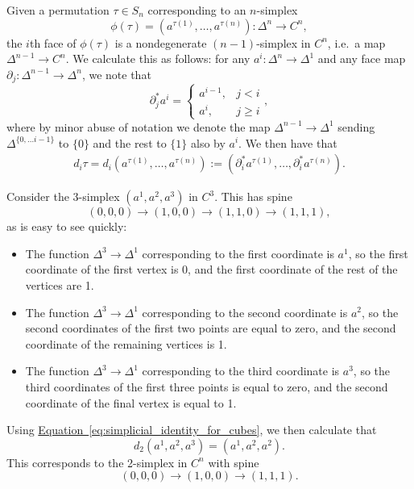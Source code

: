 \documentclass[main.tex]{subfiles}
\begin{document}
Given a permutation $\tau \in S_{n}$ corresponding to an $n$-simplex
\begin{equation*}
  \phi(\tau) = (a^{\tau(1)}, \ldots, a^{\tau(n)})\colon \Delta^{n} \to C^{n},
\end{equation*}
the $i$th face of $\phi(\tau)$ is a nondegenerate $(n-1)$-simplex in $C^{n}$, i.e.\ a map $\Delta^{n-1} \to C^{n}$. We calculate this as follows: for any $a^{i}\colon \Delta^{n} \to \Delta^{1}$ and any face map $\partial_{j}\colon \Delta^{n-1} \to \Delta^{n}$, we note that
\begin{equation*}
  \partial_{j}^{*}a^{i} =
  \begin{cases}
    a^{i-1}, & j < i \\
    a^{i}, & j \geq i
  \end{cases},
\end{equation*}
where by minor abuse of notation we denote the map $\Delta^{n-1} \to \Delta^{1}$ sending $\Delta^{\{0, \ldots i-1\}}$ to $\{0\}$ and the rest to $\{1\}$ also by $a^{i}$. We then have that
\begin{gather*}
  \label{eq:simplicial_identity_for_cubes}
  d_{i}\tau = d_{i}(a^{\tau(1)}, \ldots, a^{\tau(n)}) := (\partial_{i}^{*} a^{\tau(1)}, \ldots, \partial_{i}^{*} a^{\tau(n)}).
\end{gather*}

\begin{example}
  Consider the 3-simplex $(a^{1}, a^{2}, a^{3})$ in $C^{3}$. This has spine
  \begin{equation*}
    (0, 0, 0) \to (1, 0, 0) \to (1, 1, 0) \to (1, 1, 1),
  \end{equation*}
  as is easy to see quickly:
  \begin{itemize}
    \item The function $\Delta^{3} \to \Delta^{1}$ corresponding to the first coordinate is $a^{1}$, so the first coordinate of the first vertex is 0, and the first coordinate of the rest of the vertices are 1.

    \item The function $\Delta^{3} \to \Delta^{1}$ corresponding to the second coordinate is $a^{2}$, so the second coordinates of the first two points are equal to zero, and the second coordinate of the remaining vertices is 1.

    \item The function $\Delta^{3} \to \Delta^{1}$ corresponding to the third coordinate is $a^{3}$, so the third coordinates of the first three points is equal to zero, and the second coordinate of the final vertex is equal to 1.
  \end{itemize}
  Using \hyperref[eq:simplicial_identity_for_cubes]{Equation~\ref*{eq:simplicial_identity_for_cubes}}, we then calculate that
  \begin{equation*}
    d_{2} (a^{1}, a^{2}, a^{3}) = (a^{1}, a^{2}, a^{2}).
  \end{equation*}
  This corresponds to the 2-simplex in $C^{n}$ with spine
  \begin{equation*}
    (0, 0, 0) \to (1, 0, 0) \to (1, 1, 1).
  \end{equation*}
\end{example}
\end{document}
